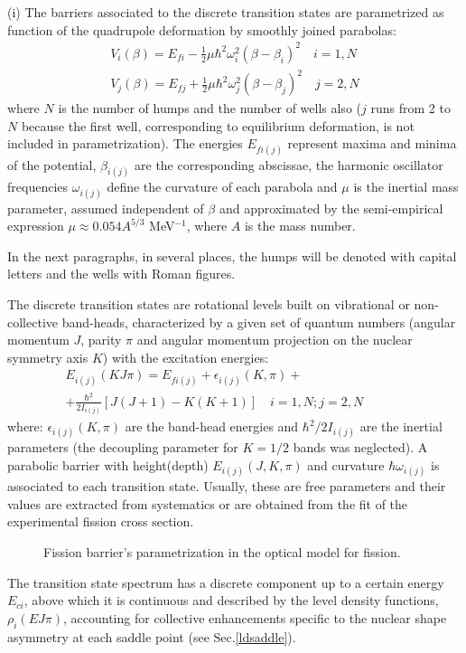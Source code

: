 \documentclass[twocolumn,amsmath,amssymb,10pt,groupedaddress,a4paper]{revtex4}
\begin{document}
(i) The barriers associated to the discrete transition states are parametrized
as function of the quadrupole deformation by smoothly joined parabolas:
\begin{eqnarray}
V_{i}(\beta)=E_{fi}-\frac{1}{2}\mu\hbar^{2}\omega_{i}^{2}(\beta
-\beta_{i})^{2}\quad i=1,N \nonumber\\
V_{j}(\beta)=E_{fj}+\frac{1}{2}\mu\hbar^{2}\omega_{j}^{2}(\beta
-\beta_{j})^{2} \quad j=2,N
\label{vfund0}%
\end{eqnarray}
where $N$ is the number of humps and the number of wells also ($j$ runs from 2 to $N$
because the first well, corresponding to equilibrium deformation, is not included in
parametrization).
The energies $E_{fi(j)}$ represent maxima and minima
of the potential, $\beta_{i(j)}$ are the corresponding abscissae, the harmonic
oscillator frequencies $\omega_{i(j)}$ define the curvature of each parabola and $\mu$ is
the inertial mass parameter, assumed independent of $\beta$ and approximated
by the semi-empirical expression $\mu\approx0.054A^{5/3}$ MeV${}^{-1}$,
where $A$ is the mass number.

In the next paragraphs, in several places, the humps will be denoted with capital letters and
the wells with Roman figures.

The discrete transition states are rotational levels built on vibrational or
non-collective band-heads, characterized by a given set of quantum numbers
(angular momentum $J$, parity $\pi$ and angular momentum projection on the
nuclear symmetry axis $K$) with the excitation energies:
%
\begin{eqnarray}
E_{i(j)}(KJ\pi)=E_{fi(j)}+\epsilon_{i(j)}(K,\pi)+\qquad\qquad\qquad\qquad\\
+\frac{\hbar^{2}}{2I_{i(j)}}[J(J+1)-K(K+1)]\quad i=1,N; j=2,N\nonumber
\label{tsrot}%
\end{eqnarray}
%
where: $\epsilon_{i(j)}(K,\pi)$ are the band-head energies and $\hbar^{2}/2I_{i(j)}$ are
the inertial parameters (the decoupling parameter for $K=1/2$ bands was neglected).
A parabolic barrier with height(depth) $E_{i(j)}(J,K,\pi)$ and curvature $\hbar
\omega_{i(j)}$ is associated to each transition state. Usually, these are free parameters
and their values are extracted from systematics or are obtained from the fit of
the experimental fission cross section.
%
%
\begin{figure}[htbp]
\caption{Fission barrier's parametrization in the optical model for fission.}
\label{fis-bar}
\end{figure}
%
The transition state spectrum has a discrete component up to a certain energy
$E_{ci}$, above which it is continuous and described by the level density
functions, $\rho_{i}(EJ\pi)$, accounting for collective enhancements specific
to the nuclear shape asymmetry at each saddle point (see Sec.\ref{ldsaddle}).
\end{document}

